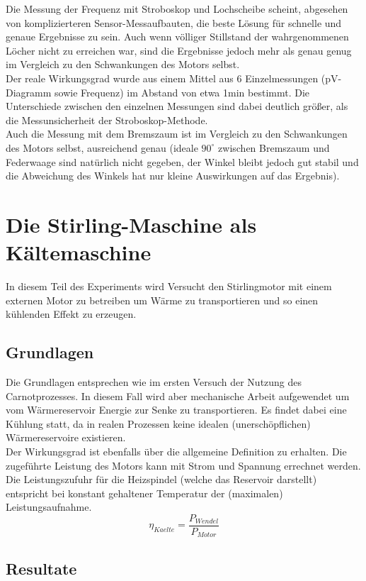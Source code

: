 \documentclass[12pt,a4paper]{article}
\begin{document}
\begin{multicols}{2}
\noindent Die Messung der Frequenz mit Stroboskop und Lochscheibe scheint, abgesehen von komplizierteren Sensor-Messaufbauten, die beste Lösung für schnelle und genaue Ergebnisse zu sein. Auch wenn völliger Stillstand der wahrgenommenen Löcher nicht zu erreichen war, sind die Ergebnisse jedoch mehr als genau genug im Vergleich zu den Schwankungen des Motors selbst.\\
Der reale Wirkungsgrad wurde aus einem Mittel aus 6 Einzelmessungen (pV-Diagramm sowie Frequenz) im Abstand von etwa 1min bestimmt. Die Unterschiede zwischen den einzelnen Messungen sind dabei deutlich größer, als die Messunsicherheit der Stroboskop-Methode.\\
Auch die Messung mit dem Bremszaum ist im Vergleich zu den Schwankungen des Motors selbst, ausreichend genau (ideale $90^\circ$ zwischen Bremszaum und Federwaage sind natürlich nicht gegeben, der Winkel bleibt jedoch gut stabil und die Abweichung des Winkels hat nur kleine Auswirkungen auf das Ergebnis).



\section{Die Stirling-Maschine als Kältemaschine}
In diesem Teil des Experiments wird Versucht den Stirlingmotor mit einem externen Motor zu betreiben um Wärme zu transportieren und so einen kühlenden Effekt zu erzeugen.

\subsection{Grundlagen}
Die Grundlagen entsprechen wie im ersten Versuch der Nutzung des Carnotprozesses. In diesem Fall wird aber mechanische Arbeit aufgewendet um vom Wärmereservoir Energie zur Senke zu transportieren. Es findet dabei eine Kühlung statt, da in realen Prozessen keine idealen (unerschöpflichen) Wärmereservoire existieren.\\
Der Wirkungsgrad ist ebenfalls über die allgemeine Definition zu erhalten. Die zugeführte Leistung des Motors kann mit Strom und Spannung errechnet werden. Die Leistungszufuhr für die Heizspindel (welche das Reservoir darstellt) entspricht bei konstant gehaltener Temperatur der (maximalen) Leistungsaufnahme.\\
$$\eta_{Kaelte} = \frac{P_{Wendel}}{P_{Motor}}$$
\subsection{Resultate}



\end{multicols}
\end{document}
